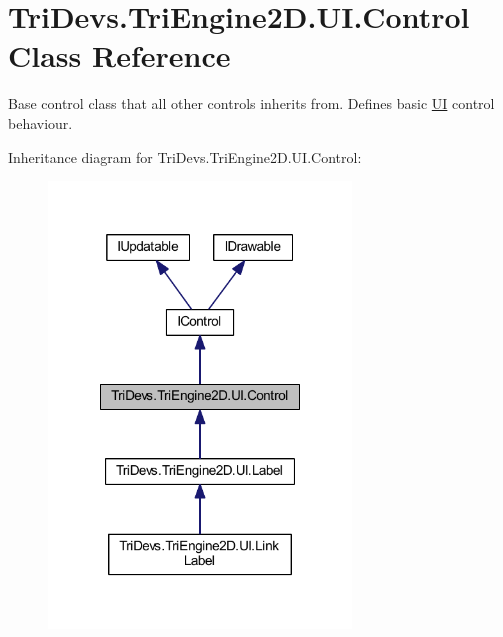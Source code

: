 \hypertarget{class_tri_devs_1_1_tri_engine2_d_1_1_u_i_1_1_control}{\section{Tri\-Devs.\-Tri\-Engine2\-D.\-U\-I.\-Control Class Reference}
\label{class_tri_devs_1_1_tri_engine2_d_1_1_u_i_1_1_control}
}


Base control class that all other controls inherits from. Defines basic \hyperlink{namespace_tri_devs_1_1_tri_engine2_d_1_1_u_i}{U\-I} control behaviour.  




Inheritance diagram for Tri\-Devs.\-Tri\-Engine2\-D.\-U\-I.\-Control\-:\nopagebreak
\begin{figure}[H]
\begin{center}
\leavevmode
\includegraphics[width=228pt]{class_tri_devs_1_1_tri_engine2_d_1_1_u_i_1_1_control__inherit__graph}
\end{center}
\end{figure}


